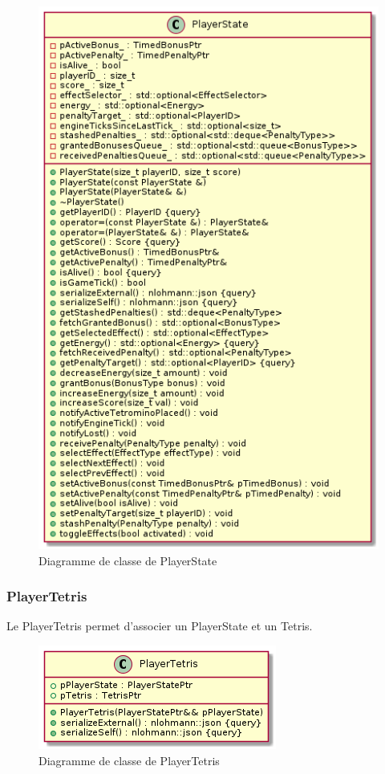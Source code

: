 \documentclass{article}
\begin{document}
\begin{figure}[!h]
	\centering
	 \includegraphics[scale=0.6]{../res/uml/class/PlayerStateClass.png}
	 \caption{Diagramme de classe de PlayerState}
	 \label{fig:PlayerStateDiagram}
\end{figure}

\subsubsection*{PlayerTetris}

Le PlayerTetris permet d'associer un PlayerState et un Tetris.

\begin{figure}[!h]
	\centering
	 \includegraphics[scale=0.6]{../res/uml/class/PlayerTetrisClass.png}
	 \caption{Diagramme de classe de PlayerTetris}
	 \label{fig:PlayerTetrisDiagram}
\end{figure}
\end{document}
